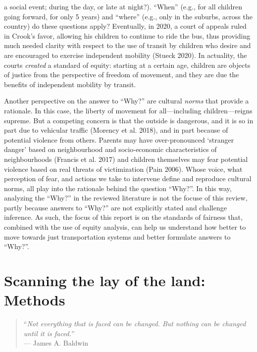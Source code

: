 \documentclass[12pt, oneside]{report}
\begin{document}
\begin{itemize}
  a social event; during the day, or late at night?). ``When'' (e.g.,
  for all children going forward, for only 5 years) and ``where'' (e.g.,
  only in the suburbs, across the country) do these questions apply?
  Eventually, in 2020, a court of appeals ruled in Crook's favor,
  allowing his children to continue to ride the bus, thus providing much
  needed clarity with respect to the use of transit by children who
  desire and are encouraged to exercise independent mobility (Stueck
  2020). In actuality, the courts \emph{created} a standard of equity:
  starting at a certain age, children are objects of justice from the
  perspective of freedom of movement, and they are due the benefits of
  independent mobility by transit.
\end{itemize}

Another perspective on the answer to ``Why?'' are cultural \emph{norms}
that provide a rationale. In this case, the liberty of movement for
all---including children---reigns supreme. But a competing concern is
that the outside is dangerous, and it is so in part due to vehicular
traffic (Morency et al. 2018), and in part because of potential violence
from others. Parents may have over-pronounced `stranger danger' based on
neighbourhood and socio-economic characteristics of neighbourhoods
(Francis et al. 2017) and children themselves may fear potential
violence based on real threats of victimization (Pain 2006). Whose
voice, what perception of fear, and actions we take to intervene define
and reproduce cultural norms, all play into the rationale behind the
question ``Why?''. In this way, analyzing the ``Why?'' in the reviewed
literature is not the focuse of this review, partly because answers to
``Why?'' are not explicitly stated and challenge inference. As such, the
focus of this report is on the standards of fairness that, combined with
the use of equity analysis, can help us understand how better to move
towards just transportation systems and better formulate answers to
``Why?''.

\hypertarget{sect3}{%
\section{Scanning the lay of the land: Methods}\label{sect3}}

\begin{quote}
``\emph{Not everything that is faced can be changed. But nothing can be
changed until it is faced.}''\\
--- James A. Baldwin
\end{quote}
\end{document}
